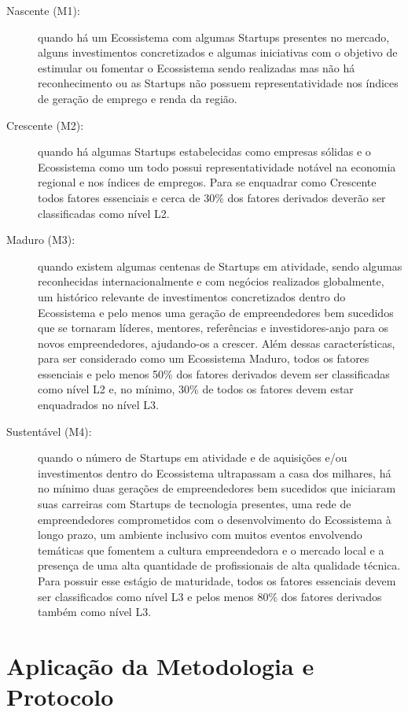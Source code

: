 \begin{description}
  \item [Nascente (M1):] quando há um Ecossistema com algumas Startups presentes no mercado, alguns investimentos concretizados e algumas iniciativas com o objetivo de estimular ou fomentar o Ecossistema sendo realizadas mas não há reconhecimento ou as Startups não possuem representatividade nos índices de geração de emprego e renda da região.

  \item [Crescente (M2):] quando há algumas Startups estabelecidas como empresas sólidas e o Ecossistema como um todo possui representatividade notável na economia regional e nos índices de empregos. Para se enquadrar como Crescente todos fatores essenciais e cerca de 30\% dos fatores derivados deverão ser classificadas como nível L2.

  \item [Maduro (M3):] quando existem algumas centenas de Startups em atividade, sendo algumas reconhecidas internacionalmente e com negócios realizados globalmente, um histórico relevante de investimentos concretizados dentro do Ecossistema e pelo menos uma geração de empreendedores bem sucedidos que se tornaram líderes, mentores, referências e investidores-anjo para os novos empreendedores, ajudando-os a crescer. Além dessas características, para ser considerado como um Ecossistema Maduro, todos os fatores essenciais e pelo menos 50\% dos fatores derivados devem ser classificadas como nível L2 e, no mínimo, 30\% de todos os fatores devem estar enquadrados no nível L3.

  \item [Sustentável (M4):] quando o número de Startups em atividade e de aquisições e/ou investimentos dentro do Ecossistema ultrapassam a casa dos milhares, há no mínimo duas gerações de empreendedores bem sucedidos que iniciaram suas carreiras com Startups de tecnologia presentes, uma rede de empreendedores comprometidos com o desenvolvimento do Ecossistema à longo prazo, um ambiente inclusivo com muitos eventos envolvendo temáticas que fomentem a cultura empreendedora e o mercado local e a presença de uma alta quantidade de profissionais de alta qualidade técnica. Para possuir esse estágio de maturidade, todos os fatores essenciais devem ser classificados como nível L3 e pelos menos 80\% dos fatores derivados também como nível L3.
\end{description}

\section{Aplicação da Metodologia e Protocolo}
\label{section:aplicacao_da_metodologia}

